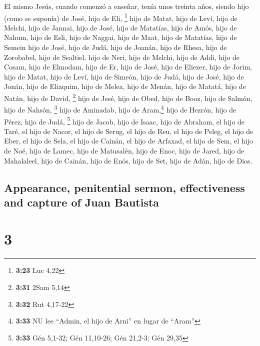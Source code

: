 \begin{paracol}{2}
 El mismo Jesús, cuando comenzó a enseñar, tenía unos
treinta años, siendo hijo (como se suponía) de José, hijo de Eli,
\footnote{\textbf{3:23} Luc 4,22}  hijo de Matat, hijo de
Leví, hijo de Melchi, hijo de Jannai, hijo de José,  hijo
de Matatías, hijo de Amós, hijo de Nahum, hijo de Esli, hijo de Naggai,
 hijo de Maat, hijo de Matatías, hijo de Semein hijo de
José, hijo de Judá,  hijo de Joanán, hijo de Rhesa, hijo
de Zorobabel, hijo de Sealtiel, hijo de Neri,  hijo de
Melchi, hijo de Addi, hijo de Cosam, hijo de Elmodam, hijo de Er,
 hijo de José, hijo de Eliezer, hijo de Jorim, hijo de
Matat, hijo de Leví,  hijo de Simeón, hijo de Judá, hijo
de José, hijo de Jonán, hijo de Eliaquim,  hijo de Melea,
hijo de Menán, hijo de Matatá, hijo de Natán, hijo de David, \footnote{\textbf{3:31}
  2Sam 5,14}  hijo de Jesé, hijo de Obed, hijo de Booz,
hijo de Salmón, hijo de Nahsón, \footnote{\textbf{3:32} Rut 4,17-22}
 hijo de Aminadab, hijo de Aram,\footnote{\textbf{3:33}
  NU lee ``Admin, el hijo de Arni'' en lugar de ``Aram''} hijo de
Hezrón, hijo de Pérez, hijo de Judá, \footnote{\textbf{3:33} Gén 5,1-32;
  Gén 11,10-26; Gén 21,2-3; Gén 29,35}  hijo de Jacob,
hijo de Isaac, hijo de Abraham, el hijo de Taré, el hijo de Nacor,
 el hijo de Serug, el hijo de Reu, el hijo de Peleg, el
hijo de Eber, el hijo de Sela,  el hijo de Cainán, el
hijo de Arfaxad, el hijo de Sem, el hijo de Noé, hijo de Lamec,
 hijo de Matusalén, hijo de Enoc, hijo de Jared, hijo de
Mahalaleel, hijo de Cainán,  hijo de Enós, hijo de Set,
hijo de Adán, hijo de Dios.

\switchcolumn
\begin{otherlanguage}{english}

\hypertarget{appearance-penitential-sermon-effectiveness-and-capture-of-juan-bautista}{%
\subsection{Appearance, penitential sermon, effectiveness and capture of
Juan
Bautista}\label{appearance-penitential-sermon-effectiveness-and-capture-of-juan-bautista}}

\hypertarget{section-5}{%
\section{3}\label{section-5}}


\end{otherlanguage}
\end{paracol}
